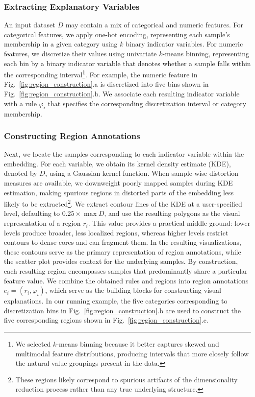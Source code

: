\documentclass[lettersize,journal]{IEEEtran}
\begin{document}
\subsubsection{Extracting Explanatory Variables}
\label{sec:discretization}

An input dataset $D$ may contain a mix of categorical and numeric features.
For categorical features, we apply one-hot encoding, representing each sample's membership in a given category using $k$ binary indicator variables.
For numeric features, we discretize their values using univariate $k$-means binning, representing each bin by a binary indicator variable that denotes whether a sample falls within the corresponding interval\footnote{We selected $k$-means binning because it better captures skewed and multimodal feature distributions, producing intervals that more closely follow the natural value groupings present in the data.}.
For example, the numeric feature in Fig.~\ref{fig:region_construction}.a is discretized into five bins shown in Fig.~\ref{fig:region_construction}.b.
We associate each resulting indicator variable with a rule $\varphi_i$ that specifies the corresponding discretization interval or category membership.

\subsubsection{Constructing Region Annotations}
\label{sec:region_construction}

Next, we locate the samples corresponding to each indicator variable within the embedding.
For each variable, we obtain its kernel density estimate (KDE), denoted by $D$, using a Gaussian kernel function.
When sample-wise distortion measures are available, we downweight poorly mapped samples during KDE estimation, making spurious regions in distorted parts of the embedding less likely to be extracted\footnote{These regions likely correspond to spurious artifacts of the dimensionality reduction process rather than any true underlying structure.}.
We extract contour lines of the KDE at a user-specified level, defaulting to $0.25 \times \max D$, and use the resulting polygons as the visual representation of a region $r_i$.
This value provides a practical middle ground: lower levels produce broader, less localized regions, whereas higher levels restrict contours to dense cores and can fragment them.
In the resulting visualizations, these contours serve as the primary representation of region annotations, while the scatter plot provides context for the underlying samples.
By construction, each resulting region encompasses samples that predominantly share a particular feature value.
We combine the obtained rules and regions into region annotations $e_i = \left( r_i, \varphi_i \right)$, which serve as the building blocks for constructing visual explanations.
In our running example, the five categories corresponding to discretization bins in Fig.~\ref{fig:region_construction}.b are used to construct the five corresponding regions shown in Fig.~\ref{fig:region_construction}.c.
\end{document}
